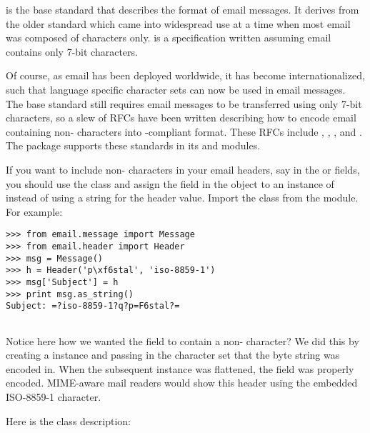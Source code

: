 
 is the base standard that describes the format of email
messages.  It derives from the older  standard which came
into widespread use at a time when most email was composed of \ASCII{}
characters only.   is a specification written assuming email
contains only 7-bit \ASCII{} characters.

Of course, as email has been deployed worldwide, it has become
internationalized, such that language specific character sets can now
be used in email messages.  The base standard still requires email
messages to be transferred using only 7-bit \ASCII{} characters, so a
slew of RFCs have been written describing how to encode email
containing non-\ASCII{} characters into -compliant format.
These RFCs include , , , and .
The  package supports these standards in its
 and  modules.

If you want to include non-\ASCII{} characters in your email headers,
say in the  or  fields, you should
use the  class and assign the field in the
 object to an instance of  instead of
using a string for the header value.  Import the  class from the
 module.  For example:

\begin{verbatim}
>>> from email.message import Message
>>> from email.header import Header
>>> msg = Message()
>>> h = Header('p\xf6stal', 'iso-8859-1')
>>> msg['Subject'] = h
>>> print msg.as_string()
Subject: =?iso-8859-1?q?p=F6stal?=


\end{verbatim}

Notice here how we wanted the  field to contain a
non-\ASCII{} character?  We did this by creating a 
instance and passing in the character set that the byte string was
encoded in.  When the subsequent  instance was
flattened, the  field was properly 
encoded.  MIME-aware mail readers would show this header using the
embedded ISO-8859-1 character.


Here is the  class description:

